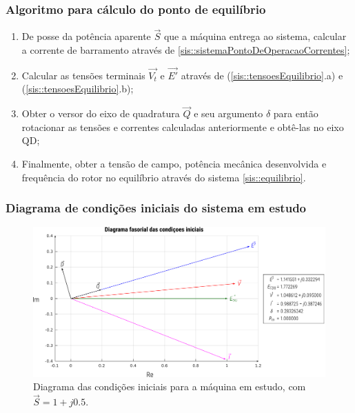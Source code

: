 \documentclass[10pt, compress,xcolor={svgnames,dvipsnames,x11names}]{beamer}
\begin{document}
\begin{frame}%
\frametitle{Algoritmo para cálculo do ponto de equilíbrio}
\scriptsize

\begin{enumerate}
	\item De posse da potência aparente $\vec{S}$ que a máquina entrega ao sistema, calcular a corrente de barramento através de \ref{sis::sistemaPontoDeOperacaoCorrentes};
	\item Calcular as tensões terminais $\vec{V_t}$ e $\vec{E'}$ através de (\ref{sis::tensoesEquilibrio}.a) e (\ref{sis::tensoesEquilibrio}.b);
	\item Obter o versor do eixo de quadratura $\vec{Q}$ e seu argumento $\delta$ para então rotacionar as tensões e correntes calculadas anteriormente e obtê-las no eixo QD;
	\item Finalmente, obter a tensão de campo, potência mecânica desenvolvida e frequência do rotor no equilíbrio através do sistema \ref{sis::equilibrio}.
\end{enumerate}

\normalsize
\end{frame}%

\begin{frame}%
\frametitle{Diagrama de condições iniciais do sistema em estudo}
\scriptsize

\begin{figure}[htb]
	\begin{center}
	    \includegraphics[width = 0.9\columnwidth]{../images/presentation/diagramaCondicoesIniciais.pdf}
	\end{center}
	\caption{\label{fig::diagramaCondicoesIniciais} Diagrama das condições iniciais para a máquina em estudo, com $\vec{S} = 1 + j0.5$.}
\end{figure}

\normalsize
\end{frame}%
\end{document}
